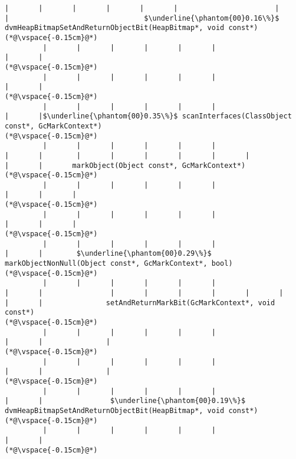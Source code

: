 \begin{lstlisting}[caption=NewDirectByteBuffer, label=profile:C2JNewDirectBuffer-512, numberbychapter=true, frame=lines, float, floatplacement=t]
         |       |       |       |       |       |                       |       |                                $\underline{\phantom{00}0.16\%}$ dvmHeapBitmapSetAndReturnObjectBit(HeapBitmap*, void const*)
(*@\vspace{-0.15cm}@*)
         |       |       |       |       |       |                       |       |
(*@\vspace{-0.15cm}@*)
         |       |       |       |       |       |                       |       |
(*@\vspace{-0.15cm}@*)
         |       |       |       |       |       |                       |       |$\underline{\phantom{00}0.35\%}$ scanInterfaces(ClassObject const*, GcMarkContext*)
(*@\vspace{-0.15cm}@*)
         |       |       |       |       |       |                       |       |        |       |       |       |       |       |                       |       |       markObject(Object const*, GcMarkContext*)
(*@\vspace{-0.15cm}@*)
         |       |       |       |       |       |                       |       |       |
(*@\vspace{-0.15cm}@*)
         |       |       |       |       |       |                       |       |       |
(*@\vspace{-0.15cm}@*)
         |       |       |       |       |       |                       |       |        $\underline{\phantom{00}0.29\%}$ markObjectNonNull(Object const*, GcMarkContext*, bool)
(*@\vspace{-0.15cm}@*)
         |       |       |       |       |       |                       |       |                |       |       |       |       |       |                       |       |               setAndReturnMarkBit(GcMarkContext*, void const*)
(*@\vspace{-0.15cm}@*)
         |       |       |       |       |       |                       |       |               |
(*@\vspace{-0.15cm}@*)
         |       |       |       |       |       |                       |       |               |
(*@\vspace{-0.15cm}@*)
         |       |       |       |       |       |                       |       |                $\underline{\phantom{00}0.19\%}$ dvmHeapBitmapSetAndReturnObjectBit(HeapBitmap*, void const*)
(*@\vspace{-0.15cm}@*)
         |       |       |       |       |       |                       |       |
(*@\vspace{-0.15cm}@*)

\end{lstlisting}
